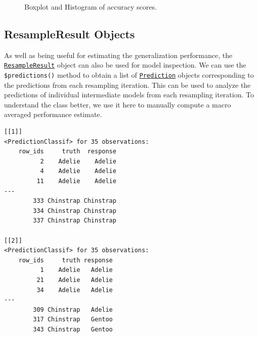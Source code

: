 \begin{figure}
\begin{minipage}[t]{0.50\linewidth}
{{}

}

\end{minipage}%

\caption{\label{fig-resamp-viz}Boxplot and Histogram of accuracy
scores.}

\end{figure}

\hypertarget{sec-resampling-inspect}{%
\subsection{ResampleResult Objects}\label{sec-resampling-inspect}}

As well as being useful for estimating the generalization performance,
the
\href{https://mlr3.mlr-org.com/reference/ResampleResult.html}{\texttt{ResampleResult}}
object can also be used for model inspection. We can use the
\texttt{\$predictions()} method to obtain a list of
\href{https://mlr3.mlr-org.com/reference/Prediction.html}{\texttt{Prediction}}
objects corresponding to the predictions from each resampling iteration.
This can be used to analyze the predictions of individual intermediate
models from each resampling iteration. To understand the class better,
we use it here to manually compute a macro averaged performance
estimate.

\begin{Shaded}
\begin{Highlighting}[]
\OtherTok{=}\SpecialCharTok{$}\NormalTok{()}
\NormalTok{rrp[}\SpecialCharTok{:}\NormalTok{]}
\end{Highlighting}
\end{Shaded}

\begin{verbatim}
[[1]]
<PredictionClassif> for 35 observations:
    row_ids     truth  response
          2    Adelie    Adelie
          4    Adelie    Adelie
         11    Adelie    Adelie
---                            
        333 Chinstrap Chinstrap
        334 Chinstrap Chinstrap
        337 Chinstrap Chinstrap

[[2]]
<PredictionClassif> for 35 observations:
    row_ids     truth response
          1    Adelie   Adelie
         21    Adelie   Adelie
         34    Adelie   Adelie
---                           
        309 Chinstrap   Adelie
        317 Chinstrap   Gentoo
        343 Chinstrap   Gentoo
\end{verbatim}

